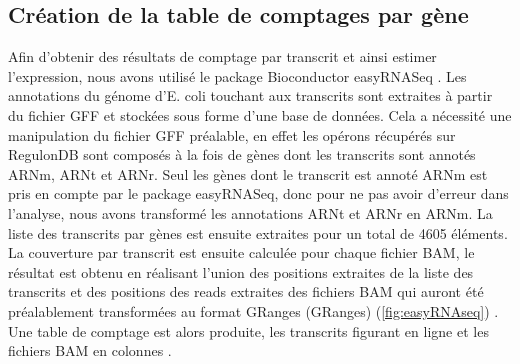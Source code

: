 \documentclass[12pt,a4paper]{report}
\begin{document}
\begin{onehalfspace}
\subsection*{Création de la table de comptages par gène}
Afin d'obtenir des résultats de comptage par transcrit et ainsi estimer l'expression, nous avons utilisé le package Bioconductor easyRNASeq \citep{Delhomme2012}. Les annotations du génome d'E. coli touchant aux transcrits sont extraites à partir du fichier GFF et stockées sous forme d'une base de données. Cela a nécessité une manipulation du fichier GFF préalable, en effet les opérons récupérés sur RegulonDB sont composés à la fois de gènes dont les transcrits sont annotés ARNm, ARNt et ARNr. Seul les gènes dont le transcrit est annoté ARNm est pris en compte par le package easyRNASeq, donc pour ne pas avoir d'erreur dans l'analyse, nous avons transformé les annotations ARNt et ARNr en ARNm.
La liste des transcrits par gènes est ensuite extraites pour un total de 4605 éléments. La couverture par transcrit est ensuite calculée pour chaque fichier BAM, le résultat est obtenu en réalisant l'union des positions extraites de la liste des transcrits et des positions des reads extraites des fichiers BAM qui auront été préalablement transformées au format \gls{GRanges} (GRanges) (\autoref{fig:easyRNAseq}) \citep{Lawrence2013}. Une table de comptage est alors produite, les transcrits figurant en ligne et les fichiers BAM en colonnes .


\end{onehalfspace}
\end{document}
